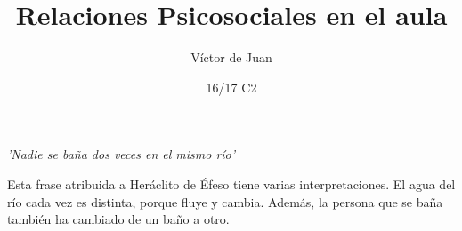 \documentclass[palatino]{apuntesURJC}
\title{Relaciones Psicosociales en el aula}
\author{Víctor de Juan}
\date{16/17 C2}
\begin{document}
\pagestyle{plain}
\maketitle

\tableofcontents
\newpage


\textit{’Nadie se baña dos veces en el mismo río’}

Esta frase atribuida a Heráclito de Éfeso tiene varias interpretaciones. 
%
El agua del río cada vez es distinta, porque fluye y cambia. 
%
Además, la persona que se baña también ha cambiado de un baño a otro.



\appendix



\printindex
\end{document}
